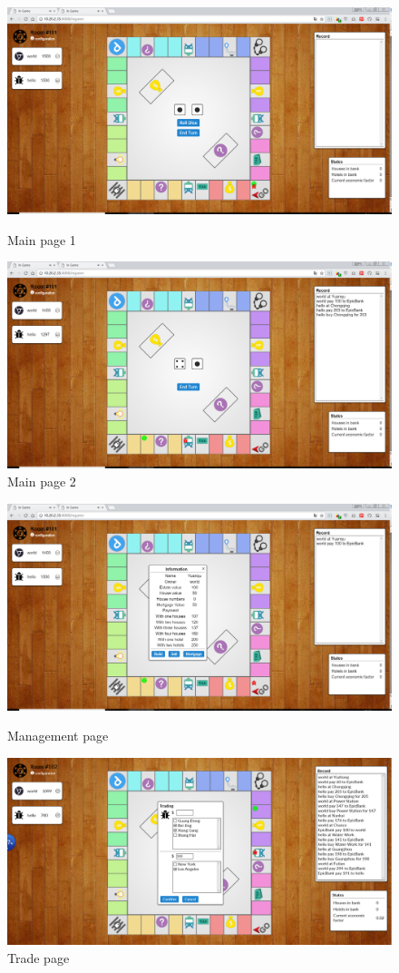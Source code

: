 \documentclass[a4paper,12pt]{article}
\begin{document}
\begin{figure}[htbp]
\includegraphics[scale=0.32]{image/ingame1.png}
\caption{Main page 1}
\includegraphics[scale=0.32]{image/ingame3.png}
\caption{Main page 2}
\end{figure}
\begin{figure}[htbp]
\includegraphics[scale=0.32]{image/ingame2.png}
\caption{Management page}
\includegraphics[scale=0.19]{image/trade.png}
\caption{Trade page}
\end{figure}
\end{document}
